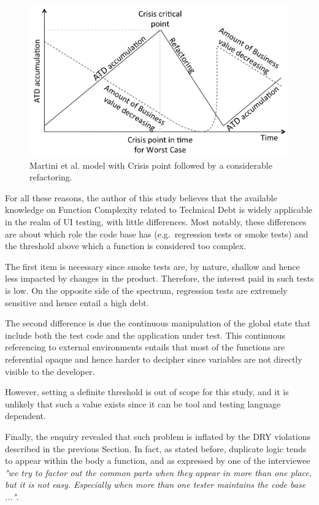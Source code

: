     \begin{figure}[!htbp]
    	\centering
    	\includegraphics{figure/discussion/martini-model.png}
    	\caption{Martini et al. \cite{martini2014architecture} model with Crisis point followed by a considerable refactoring.}
    	\label{fig:antonio-model}
		\end{figure}

    For all these reasons, the author of this study believes that the available knowledge on Function Complexity related to Technical Debt is widely applicable in the realm of UI testing, with little differences. Most notably, these differences are about which role the code base has (e.g.\ regression tests or smoke tests) and the threshold above which a function is considered too complex.


     \label{sec:disc-rq3-function-complexity}
    The first item is necessary since smoke tests are, by nature, shallow and hence less impacted by changes in the product. Therefore, the interest paid in such tests is low. On the opposite side of the spectrum, regression tests are extremely sensitive and hence entail a high debt.

    The second difference is due the continuous manipulation of the global state that include both the test code and the application under test. This continuous referencing to external environments entails that most of the functions are referential opaque \cite{referential_transparency} and hence harder to decipher since variables are not directly visible to the developer.

    However, setting a definite threshold is out of scope for this study, and it is unlikely that such a value exists since it can be tool and testing language dependent.

    Finally, the enquiry revealed that such problem is inflated by the DRY violations described in the previous Section. In fact, as stated before, duplicate logic tends to appear within the body a function, and as expressed by one of the interviewee \textit{"we try to factor out the common parts when they appear in more than one place, but it is not easy. Especially when more than one tester maintains the code base ..."}.




